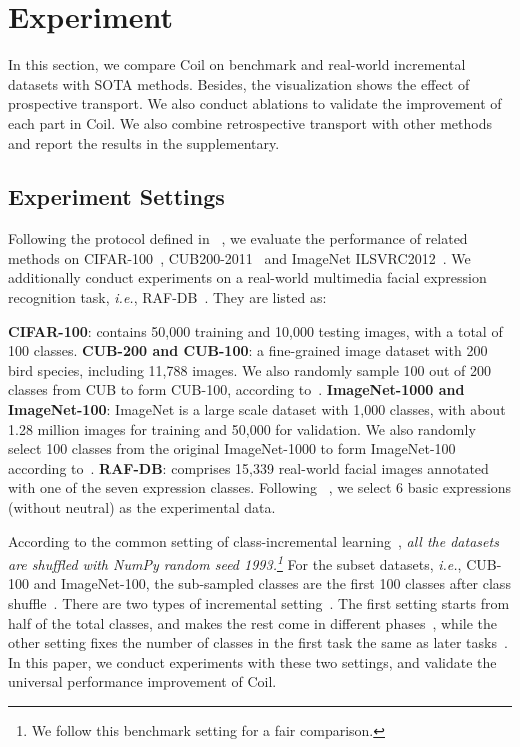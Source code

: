 \documentclass[sigconf]{acmart}
\newcommand{\ie}{\emph{i.e.}}
\newcommand{\bfname}[1]{{\bf #1}}
\newcommand{\name}{{\sc Coil }}
\newcommand{\mame}{{\sc Coil}}
\begin{document}
\section{Experiment}
In this section, we compare \name on benchmark and real-world incremental datasets with SOTA methods. Besides, the visualization shows the effect of prospective transport.
We also conduct ablations to validate the improvement of each part in \mame. We also combine retrospective transport with other methods and report the results in the supplementary.


\subsection{Experiment Settings}
 Following the protocol defined in ~\cite{rebuffi2017icarl,wu2019large,yu2020semantic}, we evaluate the performance of related methods on CIFAR-100~\cite{krizhevsky2009learning}, CUB200-2011~\cite{WahCUB2002011} and ImageNet ILSVRC2012~\cite{ILSVRC15}. We additionally conduct experiments on a real-world multimedia facial expression recognition task, \ie, RAF-DB~\cite{li2018reliable}.  They are listed as:

{ \bfname{CIFAR-100}}: contains 50,000  training and 10,000 testing images, with a total of 100 classes.
\bfname{CUB-200 and CUB-100}:  a fine-grained image dataset with 200 bird species, including 11,788 images. We also randomly sample 100 out of 200 classes from CUB to form CUB-100, according to~\cite{yu2020semantic}.
{\bfname{ImageNet-1000 and ImageNet-100}}: ImageNet is a large scale dataset with 1,000 classes, with about 1.28 million images for training and 50,000 for validation. We also randomly select 100 classes from the original ImageNet-1000 to form ImageNet-100 according to~\cite{wu2019large}.
{\bfname{RAF-DB}}: comprises 15,339 real-world facial images annotated with one of the seven expression classes. Following ~\cite{zhu2020iexpressnet,kacem2017novel,yang2018facial}, we select 6 basic expressions (without neutral) as the experimental data.




According to the common setting of class-incremental learning~\cite{rebuffi2017icarl}, 
\emph{all the datasets are shuffled with NumPy random seed 1993.\footnote{We follow this benchmark setting for a fair comparison.}}
For the subset datasets, \ie, CUB-100 and ImageNet-100, the sub-sampled classes are the first 100 classes after class shuffle~\cite{wu2019large,yu2020semantic}.
There are two types of incremental setting~\cite{rebuffi2017icarl,yu2020semantic}. The first setting starts from half of the total classes, and makes the rest come in different phases~\cite{hou2019learning,yu2020semantic}, while the other setting fixes the number of classes in the first task the same as  later tasks~\cite{rebuffi2017icarl,zhao2020maintaining}.  In this paper, we conduct experiments with these two settings, and validate the universal performance improvement of \mame.
\end{document}
